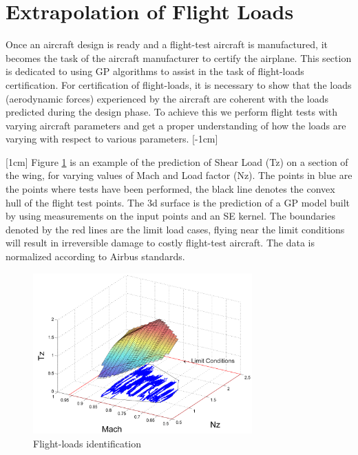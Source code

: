\section{Extrapolation of Flight Loads}\label{subsecMTGPExtrapolation}
Once an aircraft design is ready and a flight-test aircraft is manufactured, it becomes the task of the aircraft manufacturer to certify the airplane. This section is dedicated to using GP algorithms to assist in the task of flight-loads certification. For certification of flight-loads, it is necessary to show that the loads (aerodynamic forces) experienced by the aircraft are coherent with the loads predicted during the design phase. To achieve this we perform flight tests with varying aircraft parameters and get a proper understanding of how the loads are varying with respect to various parameters.
[-1cm]

[1cm]
Figure \ref{fig:flightLoadsDiagram} is an example of the prediction of Shear Load (Tz) on a section of the wing, for varying values of Mach and Load factor (Nz). The points in blue are the points where tests have been performed, the black line denotes the convex hull of the flight test points. The 3d surface is the prediction of a GP model built by using measurements on the input points and an SE kernel. The boundaries denoted by the red lines are the limit load cases, flying near the limit conditions will result in irreversible damage to costly flight-test aircraft. The data is normalized according to Airbus standards.

\begin{figure}[ht!]
 \centering
 \includegraphics[width=0.75\textwidth]{images/part3/loadDomain}
 \caption{Flight-loads identification}
 \label{fig:flightLoadsDiagram}
\end{figure}

